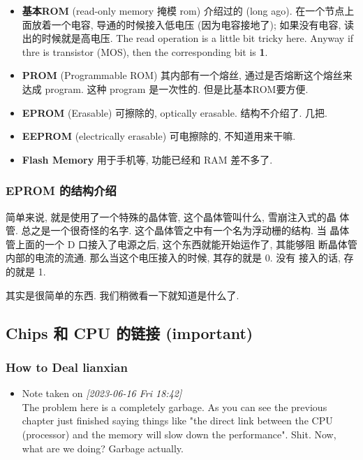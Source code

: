 \documentclass[11pt]{article}
\begin{document}
\begin{itemize}
\item \textbf{基本ROM} (read-only memory 掩模 rom) 介绍过的 (long ago). 在一个节点上面放着一个电容, 导通的时候接入低电压 (因为电容接地了); 如果没有电容, 读出的时候就是高电压. The read operation is a little bit tricky here. Anyway if thre is transistor (MOS), then the corresponding bit is \textbf{1}.

\item \textbf{PROM} (Programmable ROM) 其内部有一个熔丝, 通过是否熔断这个熔丝来达成
program. 这种 program 是一次性的. 但是比基本ROM要方便.

\item \textbf{EPROM} (Erasable) 可擦除的, optically erasable. 结构不介绍了. 几把.

\item \textbf{EEPROM} (electrically erasable) 可电擦除的, 不知道用来干嘛.

\item \textbf{Flash Memory} 用于手机等, 功能已经和 RAM 差不多了.
\end{itemize}

\subsubsection{EPROM 的结构介绍}
\label{sec:org2885312}

简单来说, 就是使用了一个特殊的晶体管, 这个晶体管叫什么, 雪崩注入式的晶
体管. 总之是一个很奇怪的名字. 这个晶体管之中有一个名为浮动栅的结构. 当
晶体管上面的一个 D 口接入了电源之后, 这个东西就能开始运作了, 其能够阻
断晶体管内部的电流的流通. 那么当这个电压接入的时候, 其存的就是 0. 没有
接入的话, 存的就是 1.

其实是很简单的东西. 我们稍微看一下就知道是什么了.

\subsection{Chips 和 CPU 的链接 (important)}
\label{sec:org8dce41f}

\subsubsection{How to Deal lianxian}
\label{sec:org4cf27c3}

\begin{itemize}
\item Note taken on \textit{[2023-06-16 Fri 18:42] } \\
The problem here is a completely garbage. As you can see the previous chapter just finished saying things like "the direct link between the CPU  (processor) and the memory will slow down the performance". Shit. Now, what are we doing? Garbage actually.
\end{itemize}
\end{document}
